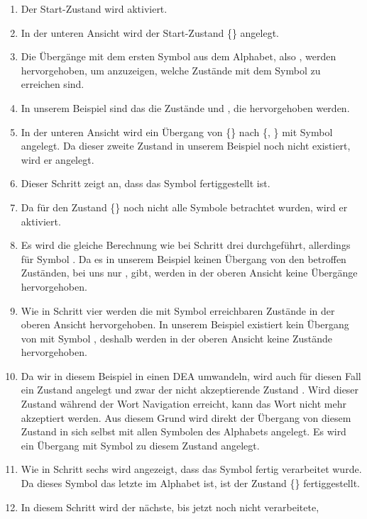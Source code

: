 \begin{enumerate}
  \item Der Start-Zustand  wird aktiviert.
  \item In der unteren Ansicht wird der Start-Zustand \{\} angelegt.
  \item Die Übergänge mit dem ersten Symbol aus dem Alphabet, also ,
  werden hervorgehoben, um anzuzeigen, welche Zustände mit dem Symbol zu
  erreichen sind.
  \item In unserem Beispiel sind das die Zustände  und ,
  die hervorgehoben werden.
  \item In der unteren Ansicht wird ein Übergang von \{\} nach
  \{, \} mit Symbol  angelegt. Da dieser zweite
  Zustand in unserem Beispiel noch nicht existiert, wird er angelegt.
  \item Dieser Schritt zeigt an, dass das Symbol  fertiggestellt ist.
  \item Da für den Zustand \{\} noch nicht alle Symbole betrachtet
  wurden, wird er aktiviert.
  \item Es wird die gleiche Berechnung wie bei Schritt drei durchgeführt,
  allerdings für Symbol . Da es in unserem Beispiel keinen Übergang
  von den betroffen Zuständen, bei uns nur , gibt, werden in der
  oberen Ansicht keine Übergänge hervorgehoben.
  \item Wie in Schritt vier werden die mit Symbol  erreichbaren
  Zustände in der oberen Ansicht hervorgehoben. In unserem Beispiel existiert
  kein Übergang von  mit Symbol , deshalb werden in der
  oberen Ansicht keine Zustände hervorgehoben.
  \item Da wir in diesem Beispiel in einen DEA umwandeln, wird auch für diesen
  Fall ein Zustand angelegt und zwar der nicht akzeptierende Zustand
  \State{$\emptyset$}. Wird dieser Zustand während der Wort Navigation
  erreicht, kann das Wort nicht mehr akzeptiert werden. Aus diesem Grund wird
  direkt der Übergang von diesem Zustand in sich selbst mit allen Symbolen des
  Alphabets angelegt. Es wird ein Übergang mit Symbol  zu diesem
  Zustand \State{$\emptyset$} angelegt.
  \item Wie in Schritt sechs wird angezeigt, dass das Symbol  fertig
  verarbeitet wurde. Da dieses Symbol das letzte im Alphabet ist, ist der
  Zustand \{\} fertiggestellt.
  \item In diesem Schritt wird der nächste, bis jetzt noch nicht verarbeitete,

\end{enumerate}
